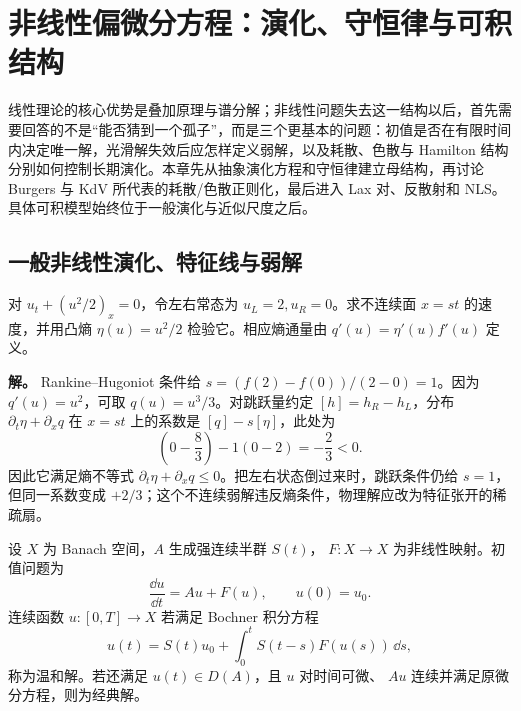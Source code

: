 \chapter{非线性偏微分方程：演化、守恒律与可积结构} \label{chap:math-pde}
\label{chap:nonlinear-pde}

线性理论的核心优势是叠加原理与谱分解；非线性问题失去这一结构以后，首先需要回答的不是“能否猜到一个孤子”，而是三个更基本的问题：初值是否在有限时间内决定唯一解，光滑解失效后应怎样定义弱解，以及耗散、色散与 Hamilton 结构分别如何控制长期演化。本章先从抽象演化方程和守恒律建立母结构，再讨论 Burgers 与 KdV 所代表的耗散/色散正则化，最后进入 Lax 对、反散射和 NLS。具体可积模型始终位于一般演化与近似尺度之后。

\section{一般非线性演化、特征线与弱解}

\begin{workedexample}
对 \(u_t+(u^2/2)_x=0\)，令左右常态为 \(u_L=2,u_R=0\)。求不连续面 \(x=st\) 的速度，并用凸熵 \(\eta(u)=u^2/2\) 检验它。相应熵通量由 \(q'(u)=\eta'(u)f'(u)\) 定义。

\textbf{解。} Rankine--Hugoniot 条件给 \(s=(f(2)-f(0))/(2-0)=1\)。因为 \(q'(u)=u^2\)，可取 \(q(u)=u^3/3\)。对跳跃量约定 \([h]=h_R-h_L\)，分布 \(\partial_t\eta+\partial_xq\) 在 \(x=st\) 上的系数是 \([q]-s[\eta]\)，此处为
\[
\left(0-\frac83\right)-1(0-2)=-\frac23<0.
\]
因此它满足熵不等式 \(\partial_t\eta+\partial_xq\le0\)。把左右状态倒过来时，跳跃条件仍给 \(s=1\)，但同一系数变成 \(+2/3\)；这个不连续弱解违反熵条件，物理解应改为特征张开的稀疏扇。

\end{workedexample}

\label{sec:nonlinear-evolution-general}
\begin{definition}[半线性演化的温和解]
设 $X$ 为 Banach 空间，$A$ 生成强连续半群 $S(t)$，
$F:X\to X$ 为非线性映射。初值问题为
\begin{equation}
\frac{\dd u}{\dd t}=Au+F(u),\qquad u(0)=u_0.
\label{eq:abstract-semilinear-evolution}
\end{equation}
连续函数 $u:[0,T]\to X$ 若满足 Bochner 积分方程
\begin{equation}
u(t)=S(t)u_0+\int_0^t S(t-s)F(u(s))\,\dd s,
\label{eq:duhamel-semilinear}
\end{equation}
称为温和解。若还满足 $u(t)\in D(A)$，且 $u$ 对时间可微、
$Au$ 连续并满足原微分方程，则为经典解。
\end{definition}

